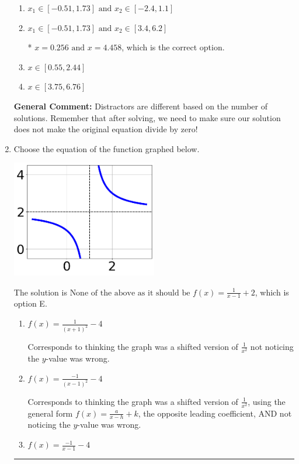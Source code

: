 \documentclass{extbook}[14pt]
\newcommand{\litem}[1]{\item #1

\rule{\textwidth}{0.4pt}}
\begin{document}
\begin{enumerate}
{\begin{enumerate}[label=\Alph*.]
\item \( x_1 \in [-0.51, 1.73] \text{ and } x_2 \in [-2.4,1.1] \)


\item \( x_1 \in [-0.51, 1.73] \text{ and } x_2 \in [3.4,6.2] \)

* $x = 0.256 \text{ and } x = 4.458$, which is the correct option.
\item \( x \in [0.55,2.44] \)


\item \( x \in [3.75,6.76] \)


\end{enumerate}

\textbf{General Comment:} Distractors are different based on the number of solutions. Remember that after solving, we need to make sure our solution does not make the original equation divide by zero!
}
\litem{
Choose the equation of the function graphed below.

\begin{center}
    \includegraphics[width=0.5\textwidth]{../Figures/rationalGraphToEquationB.png}
\end{center}


The solution is \( \text{None of the above as it should be } f(x) = \frac{1}{x - 1} + 2 \), which is option E.\begin{enumerate}[label=\Alph*.]
\item \( f(x) = \frac{1}{(x + 1)^2} - 4 \)

Corresponds to thinking the graph was a shifted version of $\frac{1}{x^2}$ not noticing the $y$-value was wrong.
\item \( f(x) = \frac{-1}{(x - 1)^2} - 4 \)

Corresponds to thinking the graph was a shifted version of $\frac{1}{x^2}$, using the general form $f(x) = \frac{a}{x-h}+k$, the opposite leading coefficient, AND not noticing the $y$-value was wrong.
\item \( f(x) = \frac{-1}{x - 1} - 4 \)


\end{enumerate}}
\end{enumerate}
\end{document}
